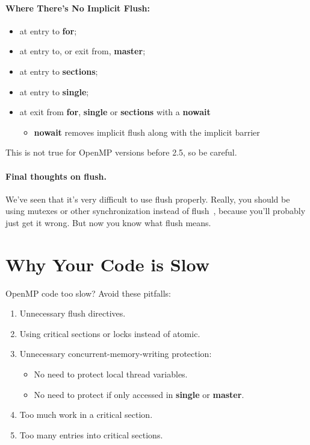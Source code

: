 \documentclass[a4paper]{report}
\begin{document}
\paragraph{Where There's No Implicit Flush:}
  \begin{itemize}[noitemsep]
    \item at entry to {\bf for};
    \item at entry to, or exit from, {\bf master};
    \item at entry to {\bf sections};
    \item at entry to {\bf single};
    \item at exit from {\bf for}, {\bf single} or {\bf sections} with a {\bf nowait}
      \begin{itemize}
        \item {\bf nowait} removes implicit flush along with the implicit barrier
      \end{itemize}
  \end{itemize}

This is not true for OpenMP versions before 2.5, so be careful.

\paragraph{Final thoughts on flush.} We've seen that it's very difficult to use flush properly. Really, you should be using mutexes or other synchronization instead of flush~\cite{flush}, because you'll probably just get it wrong. But now you know what flush means.


\section*{Why Your Code is Slow}
OpenMP code too slow? Avoid these pitfalls:
  \begin{enumerate}
    \item Unnecessary flush directives.
    \item Using critical sections or locks instead of atomic.
    \item Unnecessary concurrent-memory-writing protection:
      \begin{itemize}
        \item No need to protect local thread variables.
        \item No need to protect if only accessed in {\bf single} or
          {\bf master}.
      \end{itemize}
    \item Too much work in a critical section.
    \item Too many entries into critical sections.
  \end{enumerate}
\end{document}
